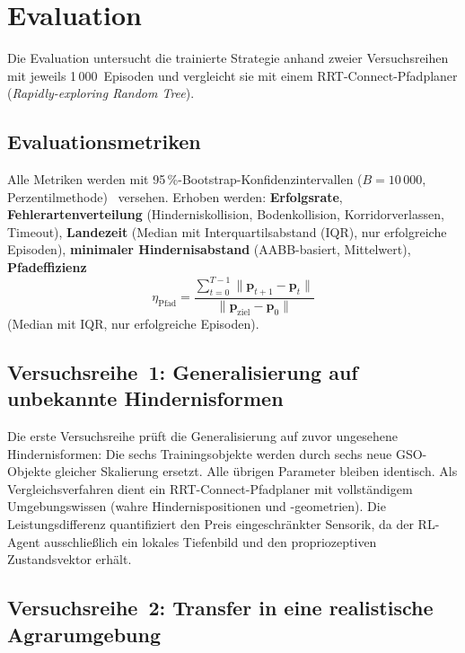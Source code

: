 \section{Evaluation}
\label{sec:meth_evaluation}

Die Evaluation untersucht die trainierte Strategie anhand zweier
Versuchsreihen mit jeweils 1\,000~Episoden und vergleicht sie mit einem
RRT-Connect-Pfadplaner (\textit{Rapidly-exploring Random Tree}).

\subsection{Evaluationsmetriken}
\label{subsec:meth_metriken}

Alle Metriken werden mit 95\,\%-Bootstrap-Konfidenzintervallen
($B = 10\,000$,
Perzentilmethode)~\autocite{efronIntroductionBootstrap1994} versehen.
Erhoben werden: \textbf{Erfolgsrate}, \textbf{Fehlerartenverteilung}
(Hinderniskollision, Bodenkollision, Korridorverlassen, Timeout),
\textbf{Landezeit} (Median mit Interquartilsabstand (IQR), nur erfolgreiche Episoden),
\textbf{minimaler Hindernisabstand} (AABB-basiert, Mittelwert), \textbf{Pfadeffizienz}
\begin{equation} \label{eq:meth_path_efficiency}
  \eta_{\mathrm{Pfad}} = \frac{\sum_{t=0}^{T-1} \lVert \mathbf{p}_{t+1} - \mathbf{p}_t \rVert}
  {\lVert \mathbf{p}_{\mathrm{ziel}} - \mathbf{p}_0 \rVert}
\end{equation}
(Median mit IQR, nur erfolgreiche Episoden).

\subsection{Versuchsreihe~1: Generalisierung auf unbekannte Hindernisformen}
\label{subsec:meth_versuch1}

Die erste Versuchsreihe prüft die Generalisierung auf zuvor ungesehene
Hindernisformen: Die sechs Trainingsobjekte werden durch sechs neue
GSO-Objekte gleicher Skalierung ersetzt. Alle übrigen Parameter bleiben
identisch. Als Vergleichsverfahren dient ein RRT-Connect-Pfadplaner mit
vollständigem Umgebungswissen (wahre Hindernispositionen und -geometrien). Die
Leistungsdifferenz quantifiziert den Preis eingeschränkter Sensorik, da
der RL-Agent ausschließlich ein lokales Tiefenbild und den
propriozeptiven Zustandsvektor erhält.

\subsection{Versuchsreihe~2: Transfer in eine realistische Agrarumgebung}
\label{subsec:meth_versuch2}

